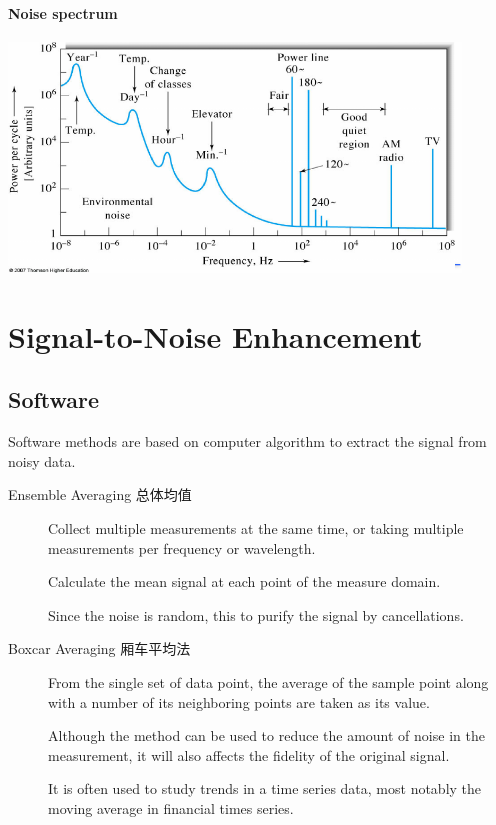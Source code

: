 \documentclass[a4paper,UTF8]{article}
\theoremstyle{mystyle}{
  \newtheorem{law}{Law}
}
\begin{document}
\paragraph{Noise spectrum}
\begin{center}
\includegraphics[width=0.9\textwidth]{fig/noise_spec}
\end{center}



\section{Signal-to-Noise Enhancement}
\subsection{Software}
Software methods are based on computer algorithm to extract
the signal from noisy data.
\begin{description}
\item[Ensemble Averaging 总体均值]
Collect multiple measurements at the same time, or taking
multiple measurements per frequency or wavelength.

Calculate the mean signal at each point of the measure
domain.

Since the noise is random, this to purify the signal by
cancellations.
\item[Boxcar Averaging 厢车平均法]
From the single set of data point, the average of the sample
point along with a number of its neighboring points are taken
as its value.

Although the method can be used to reduce the amount of
noise in the measurement, it will also affects the fidelity of the
original signal.

It is often used to study trends in a time series data, most
notably the moving average in financial times series.
\end{description}
\end{document}
